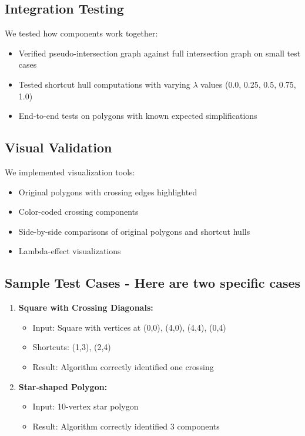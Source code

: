 \documentclass[11pt]{article}
\begin{document}
\subsection{Integration Testing}
We tested how components work together:
\begin{itemize}[leftmargin=*, noitemsep]
  \item Verified pseudo-intersection graph against full intersection graph on small test cases
  \item Tested shortcut hull computations with varying $\lambda$ values (0.0, 0.25, 0.5, 0.75, 1.0)
  \item End-to-end tests on polygons with known expected simplifications
\end{itemize}

\subsection{Visual Validation}
We implemented visualization tools:
\begin{itemize}[leftmargin=*, noitemsep]
  \item Original polygons with crossing edges highlighted
  \item Color-coded crossing components 
  \item Side-by-side comparisons of original polygons and shortcut hulls
  \item Lambda-effect visualizations
\end{itemize}

\subsection{Sample Test Cases - Here are two specific cases}
\begin{enumerate}[leftmargin=*, noitemsep]
  \item \textbf{Square with Crossing Diagonals:}
  \begin{itemize}[noitemsep]
    \item Input: Square with vertices at (0,0), (4,0), (4,4), (0,4)
    \item Shortcuts: (1,3), (2,4)
    \item Result: Algorithm correctly identified one crossing
  \end{itemize}
  
  \item \textbf{Star-shaped Polygon:}
  \begin{itemize}[noitemsep]
    \item Input: 10-vertex star polygon
    \item Result: Algorithm correctly identified 3 components
  \end{itemize}
\end{enumerate}
\end{document}
